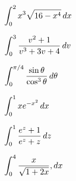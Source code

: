 \documentclass[12pt]{article}
\begin{document}
\Example $\displaystyle\int_0^2 x^3\sqrt{16-x^4}\,dx$

\vspace{60mm}

\Example $\displaystyle\int_0^3\frac{v^2+1}{v^3+3v+4}\,dv$

\vspace{60mm}

\Example $\displaystyle\int_0^{\pi/4}\frac{\sin\theta}{\cos^3\theta}\,d\theta$

\newpage

\Example $\displaystyle\int_0^1 xe^{-x^2}\,dx$

\vspace{60mm}

\Example $\displaystyle\int_0^1\frac{e^z+1}{e^z+z}\,dz$

\vspace{60mm}

\Example $\displaystyle\int_0^4\frac{x}{\sqrt{1+2x}},dx$
\end{document}
